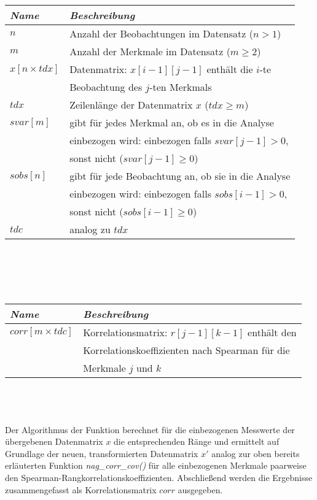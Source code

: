 \noindent \begin{tabular}[ht]{|l|l|}
  	\hline
  	\textit{Name} & \textit{Beschreibung}\\
  	\hline \hline
  	$n$ & Anzahl der Beobachtungen im Datensatz ($n > 1$)\\ \hline
  	$m$ & Anzahl der Merkmale im Datensatz ($m \geq 2$)\\ \hline
	$x[n \times tdx]$ & Datenmatrix: $x[i - 1][j - 1]$ enthält die $i$-te\\
	& Beobachtung des $j$-ten Merkmals\\ \hline
	$tdx$ & Zeilenlänge der Datenmatrix $x$ ($tdx \geq m$)\\ \hline
	$svar[m]$ & gibt für jedes Merkmal an, ob es in die Analyse\\
	& einbezogen wird: einbezogen falls $svar[j-1] > 0$,\\
	& sonst nicht ($svar[j-1] \geq 0$)\\ \hline
	$sobs[n]$ & gibt für jede Beobachtung an, ob sie in die Analyse\\
	& einbezogen wird:  einbezogen falls $sobs[i-1] > 0$, \\
	& sonst nicht ($sobs[i-1] \geq 0$)\\ \hline
	$tdc$ & analog zu $tdx$\\
	\hline
\end{tabular}\\\\

\newpage

\\
	
\noindent \begin{tabular}[ht]{|l|l|}
  	\hline
  	\textit{Name} & \textit{Beschreibung}\\
  	\hline \hline
  	$corr[m \times tdc]$ & Korrelationsmatrix: $r[j - 1][k - 1]$ enthält den\\
	& Korrelationskoeffizienten nach Spearman für die\\
	& Merkmale $j$ und $k$\\
  	\hline
\end{tabular}\\\\

\\

\noindent Der Algorithmus der Funktion berechnet für die einbezogenen Messwerte der übergebenen Datenmatrix $x$ die entsprechenden Ränge und ermittelt auf Grundlage der neuen, transformierten Datenmatrix $x'$ analog zur oben bereits erläuterten Funktion {\it nag\_corr\_cov()} für alle einbezogenen Merkmale paarweise den Spearman-Rangkorrelationskoeffizienten. Abschließend werden die Ergebnisse zusammengefasst als Korrelationsmatrix $corr$ ausgegeben.

